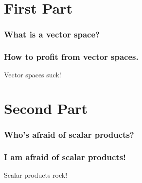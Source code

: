 \documentclass{beamer}
\begin{document}


\part{First Part}
\section{What is a vector space?}
\section{How to profit from vector spaces.}
%
\begin{frame}
  Vector spaces suck!
\end{frame}

\part{Second Part}
\section{Who's afraid of scalar products?}
\section{I am afraid of scalar products!}
\begin{frame}
  Scalar products rock!
\end{frame}
\end{document}
